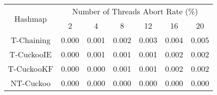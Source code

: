 \begin{tabular}{|c|c|c|c|c|c|c|}
\hline
\multirow{2}{*}{Hashmap} & \multicolumn{6}{c|}{Number of Threads Abort Rate (\%)}\\\cline{2-7}& 2 & 4 & 8 & 12 & 16 & 20\\
\hline
\hline
T-Chaining & 0.000 & 0.001 & 0.002 & 0.003 & 0.004 & 0.005\\
T-CuckooIE & 0.000 & 0.001 & 0.001 & 0.001 & 0.002 & 0.002\\
T-CuckooKF & 0.000 & 0.000 & 0.001 & 0.001 & 0.002 & 0.002\\
NT-Cuckoo & 0.000 & 0.000 & 0.000 & 0.000 & 0.000 & 0.000\\
\hline
\end{tabular}
